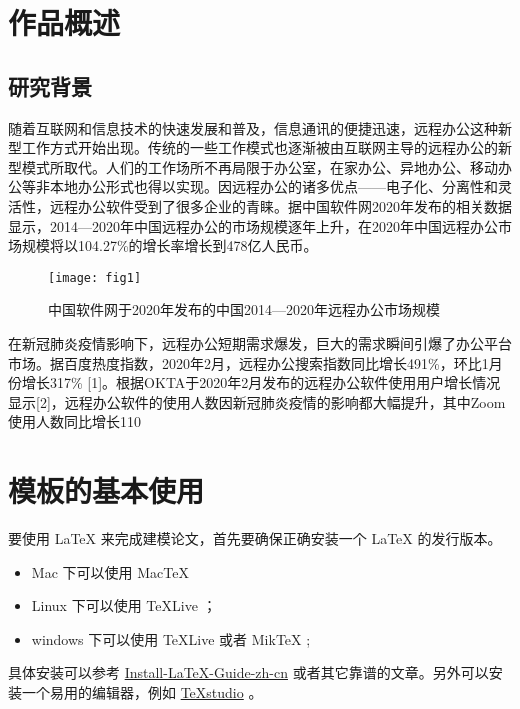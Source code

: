 \documentclass{cumcmthesis}
\begin{document}
\section{作品概述}
\subsection{研究背景}

随着互联网和信息技术的快速发展和普及，信息通讯的便捷迅速，远程办公这种新型工作方式开始出现。传统的一些工作模式也逐渐被由互联网主导的远程办公的新型模式所取代。人们的工作场所不再局限于办公室，在家办公、异地办公、移动办公等非本地办公形式也得以实现。因远程办公的诸多优点——电子化、分离性和灵活性，远程办公软件受到了很多企业的青睐。据中国软件网2020年发布的相关数据显示，2014—2020年中国远程办公的市场规模逐年上升，在2020年中国远程办公市场规模将以104.27\%的增长率增长到478亿人民币。

\begin{figure}[!h]
	\centering
	\texttt{[image: fig1]}
	\caption{中国软件网于2020年发布的中国2014—2020年远程办公市场规模}
	\label{fig:1}
\end{figure}

在新冠肺炎疫情影响下，远程办公短期需求爆发，巨大的需求瞬间引爆了办公平台市场。据百度热度指数，2020年2月，远程办公搜索指数同比增长491\%，环比1月份增长317\% [1]。根据OKTA于2020年2月发布的远程办公软件使用用户增长情况显示[2]，远程办公软件的使用人数因新冠肺炎疫情的影响都大幅提升，其中Zoom使用人数同比增长110%

\section{模板的基本使用}

要使用 \LaTeX{} 来完成建模论文，首先要确保正确安装一个 \LaTeX{} 的发行版本。

\begin{itemize}
    \item Mac 下可以使用 Mac\TeX{}
    \item Linux 下可以使用 \TeX{}Live ；
    \item windows 下可以使用 \TeX{}Live 或者 Mik\TeX{} ;
\end{itemize}

具体安装可以参考 \href{https://github.com/OsbertWang/install-latex-guide-zh-cn/releases/}{Install-LaTeX-Guide-zh-cn} 或者其它靠谱的文章。另外可以安装一个易用的编辑器，例如 \href{https://mirrors.tuna.tsinghua.edu.cn/github-release/texstudio-org/texstudio/LatestRelease/}{\TeX{}studio} 。
\end{document}
